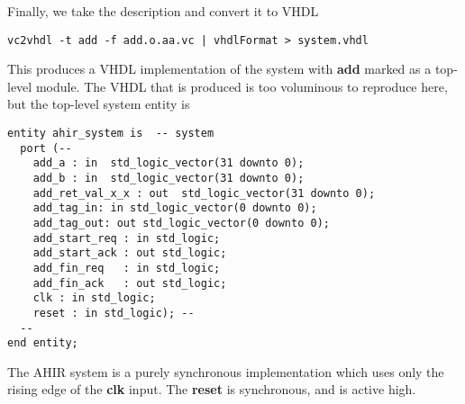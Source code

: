 Finally, we take the \vC description and convert it to
VHDL
\begin{verbatim}
vc2vhdl -t add -f add.o.aa.vc | vhdlFormat > system.vhdl
\end{verbatim}
This produces a VHDL implementation of the system with
{\bf add} marked as a top-level module.  The VHDL that
is produced is too voluminous to reproduce here, but
the top-level system entity is
\begin{verbatim}
entity ahir_system is  -- system
  port (--
    add_a : in  std_logic_vector(31 downto 0);
    add_b : in  std_logic_vector(31 downto 0);
    add_ret_val_x_x : out  std_logic_vector(31 downto 0);
    add_tag_in: in std_logic_vector(0 downto 0);
    add_tag_out: out std_logic_vector(0 downto 0);
    add_start_req : in std_logic;
    add_start_ack : out std_logic;
    add_fin_req   : in std_logic;
    add_fin_ack   : out std_logic;
    clk : in std_logic;
    reset : in std_logic); --
  --
end entity;
\end{verbatim}

The AHIR system is a purely synchronous implementation
which uses only the rising edge of the {\bf clk} input.
The {\bf reset} is synchronous, and is active high. 

